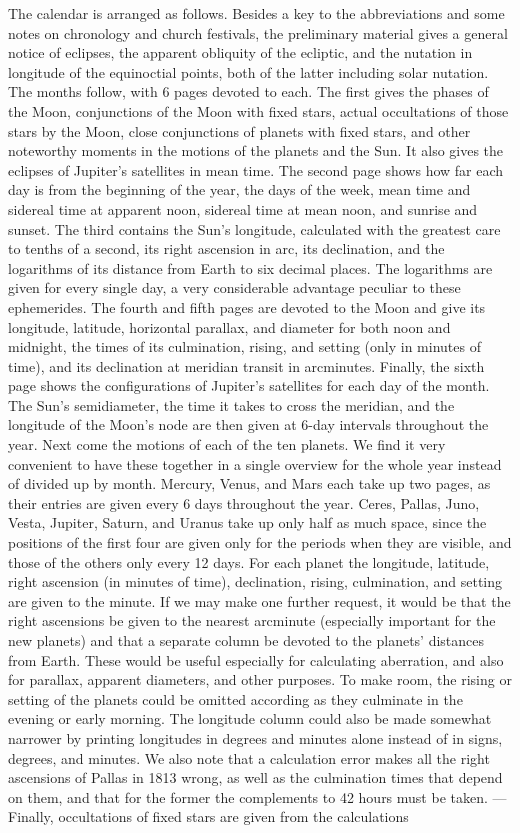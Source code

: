 The calendar is arranged as follows. Besides a key to the abbreviations and some notes on chronology and church festivals, the preliminary material gives a general notice of eclipses, the apparent obliquity of the ecliptic, and the nutation in longitude of the equinoctial points, both of the latter including solar nutation. The months follow, with 6 pages devoted to each. The first gives the phases of the Moon, conjunctions of the Moon with fixed stars, actual occultations of those stars by the Moon, close conjunctions of planets with fixed stars, and other noteworthy moments in the motions of the planets and the Sun. It also gives the eclipses of Jupiter's satellites in mean time. The second page shows how far each day is from the beginning of the year, the days of the week, mean time and sidereal time at apparent noon, sidereal time at mean noon, and sunrise and sunset. The third contains the Sun's longitude, calculated with the greatest care to tenths of a second, its right ascension in arc, its declination, and the logarithms of its distance from Earth to six decimal places. The logarithms are given for every single day, a very considerable advantage peculiar to these ephemerides. The fourth and fifth pages are devoted to the Moon and give its longitude, latitude, horizontal parallax, and diameter for both noon and midnight, the times of its culmination, rising, and setting (only in minutes of time), and its declination at meridian transit in arcminutes. Finally, the sixth page shows the configurations of Jupiter's satellites for each day of the month. The Sun's semidiameter, the time it takes to cross the meridian, and the longitude of the Moon's node are then given at 6-day intervals throughout the year. Next come the motions of each of the ten planets. We find it very convenient to have these together in a single overview for the whole year instead of divided up by month. Mercury, Venus, and Mars each take up two pages, as their entries are given every 6 days throughout the year. Ceres, Pallas, Juno, Vesta, Jupiter, Saturn, and Uranus take up only half as much space, since the positions of the first four are given only for the periods when they are visible, and those of the others only every 12 days. For each planet the longitude, latitude, right ascension (in minutes of time), declination, rising, culmination, and setting are given to the minute. If we may make one further request, it would be that the right ascensions be given to the nearest arcminute (especially important for the new planets) and that a separate column be devoted to the planets' distances from Earth. These would be useful especially for calculating aberration, and also for parallax, apparent diameters, and other purposes. To make room, the rising or setting of the planets could be omitted according as they culminate in the evening or early morning. The longitude column could also be made somewhat narrower by printing longitudes in degrees and minutes alone instead of in signs, degrees, and minutes. We also note that a calculation error makes all the right ascensions of Pallas in 1813 wrong, as well as the culmination times that depend on them, and that for the former the complements to 42 hours must be taken. --- Finally, occultations of fixed stars are given from the calculations 